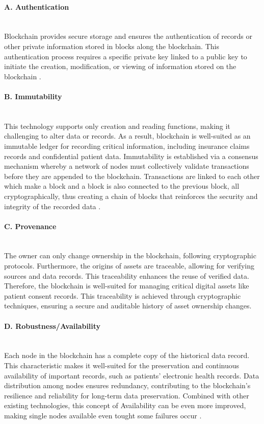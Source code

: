 \paragraph{A. Authentication} \mbox{}\\
Blockchain provides secure storage and ensures the authentication of records or other 
private information stored in blocks along the blockchain. This authentication process requires 
a specific private key linked to a public key to initiate the creation, modification, or viewing of 
information stored on the blockchain \cite{btc}.

\paragraph{B. Immutability} \mbox{}\\
This technology supports only creation and reading functions, 
making it challenging to alter data or records. As a result, blockchain is well-suited as an 
immutable ledger for recording critical information, including insurance claims records and confidential 
patient data. Immutability is established via a consensus mechanism whereby a network of nodes must collectively 
validate transactions before they are appended to the blockchain. Transactions are linked to each other which 
make a block and a block is also connected to the previous block, all cryptographically, thus creating a chain
of blocks that reinforces the security and integrity of the recorded data \cite{btc}.

\paragraph{C. Provenance} \mbox{}\\
The owner can only change ownership in the blockchain, following cryptographic protocols.
Furthermore, the origins of assets are traceable, allowing for verifying sources and data 
records. This traceability enhances the reuse of verified data. Therefore, the blockchain 
is well-suited for managing critical digital assets like patient consent records. This 
traceability is achieved through cryptographic techniques, ensuring a secure and 
auditable history of asset ownership changes.

\paragraph{D. Robustness/Availability}\mbox{}\\
Each node in the blockchain has a complete copy of the historical data 
record. This characteristic makes it well-suited for the preservation 
and continuous availability of important records, such as patients' electronic health 
records. Data distribution among nodes ensures redundancy, contributing to 
the blockchain's resilience and reliability for long-term data preservation. Combined 
with other existing technologies, this concept of Availability can be even more improved, 
making single nodes available even tought some failures occur \cite{btc}.

